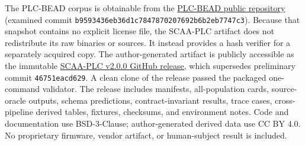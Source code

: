 \documentclass[manuscript,screen,review]{acmart}
\begin{document}
The PLC-BEAD corpus is obtainable from the \href{https://github.com/AICPS/PLCBEAD_PLCEmbed}{PLC-BEAD public repository} (examined commit \texttt{b9593436eb36d1c7847870207692b6b2eb7747c3}). Because that snapshot contains no explicit license file, the SCAA-PLC artifact does not redistribute its raw binaries or sources. It instead provides a hash verifier for a separately acquired copy. The author-generated artifact is publicly accessible as the immutable \href{https://github.com/Mewtwoz/SCAA_PLC_ARTIFACT/releases/tag/v2.0.0}{SCAA-PLC v2.0.0 GitHub release}, which supersedes preliminary commit \texttt{46751eacd629}. A clean clone of the release passed the packaged one-command validator. The release includes manifests, all-population cards, source-oracle outputs, schema predictions, contract-invariant results, trace cases, cross-pipeline derived tables, fixtures, checksums, and environment notes. Code and documentation use BSD-3-Clause; author-generated derived data use CC BY 4.0. No proprietary firmware, vendor artifact, or human-subject result is included.




\end{document}
